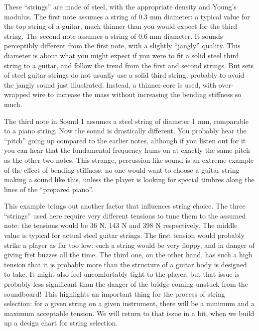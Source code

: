 
  These ``strings'' are made of steel, with the appropriate density and Young's 
  modulus. The first note assumes a string of 0.3 mm diameter: a typical value 
  for the top string of a guitar, much thinner than you would expect for the 
  third string. The second note assumes a string of 0.6 mm diameter. It sounds 
  perceptibly different from the first note, with a slightly ``jangly'' 
  quality. This diameter is about what you might expect if you were to fit a 
  solid steel third string to a guitar, and follow the trend from the first and 
  second strings. But sets of steel guitar strings do not usually use a solid 
  third string, probably to avoid the jangly sound just illustrated. Instead, a 
  thinner core is used, with over-wrapped wire to increase the mass without 
  increasing the bending stiffness so much. 

  The third note in Sound 1 assumes a steel string of diameter 1 mm, comparable 
  to a piano string. Now the sound is drastically different. You probably hear 
  the ``pitch'' going up compared to the earlier notes, although if you listen 
  out for it you can hear that the fundamental frequency hums on at exactly the 
  same pitch as the other two notes. This strange, percussion-like sound is an 
  extreme example of the effect of bending stiffness: no-one would want to 
  choose a guitar string making a sound like this, unless the player is looking 
  for special timbres along the lines of the ``prepared piano''. 

  This example brings out another factor that influences string choice. The 
  three ``strings'' used here require very different tensions to tune them to 
  the assumed note: the tensions would be 36 N, 143 N and 398 N respectively. 
  The middle value is typical for actual steel guitar strings. The first 
  tension would probably strike a player as far too low: such a string would be 
  very floppy, and in danger of giving fret buzzes all the time. The third one, 
  on the other hand, has such a high tension that it is probably more than the 
  structure of a guitar body is designed to take. It might also feel 
  uncomfortably tight to the player, but that issue is probably less 
  significant than the danger of the bridge coming unstuck from the soundboard! 
  This highlights an important thing for the process of string selection: for a 
  given string on a given instrument, there will be a minimum and a maximum 
  acceptable tension. We will return to that issue in a bit, when we build up a 
  design chart for string selection. 

